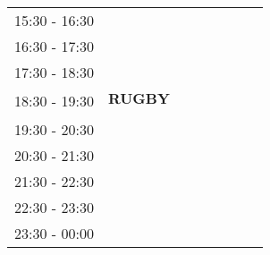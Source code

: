 \documentclass[10pt,spanish, landscape, twocolumn]{article}
\begin{document}
\begin{tabular}{|c|c|c|c|c|c|c|c|}
\multirow{2}{*}{15:30 - 16:30} & \textbf{} & \textbf{} & \textbf{} & \textbf{} & \textbf{} & \textbf{} & \textbf{} \\
& {\footnotesize } & {\footnotesize } & {\footnotesize } & {\footnotesize} & {\footnotesize} & {\footnotesize} & {\footnotesize} \\
\hline
\hline
\multirow{2}{*}{16:30 - 17:30} & \textbf{} & \textbf{} & \textbf{} & \textbf{} & \textbf{} & \textbf{} & \textbf{} \\
& {\footnotesize } & {\footnotesize } & {\footnotesize } & {\footnotesize} & {\footnotesize} & {\footnotesize} & {\footnotesize} \\
\hline
\multirow{2}{*}{17:30 - 18:30} & \textbf{} & \textbf{} & \textbf{} & \textbf{} & \textbf{} & \textbf{} & \textbf{} \\
& {\footnotesize } & {\footnotesize } & {\footnotesize } & {\footnotesize} & {\footnotesize} & {\footnotesize} & {\footnotesize} \\
\hline
\multirow{2}{*}{18:30 - 19:30} & \cellcolor{blue} \textbf{RUGBY} & \textbf{} & \textbf{} & \textbf{} & \textbf{} & \textbf{} & \textbf{} \\
& \cellcolor{blue} {\footnotesize } & {\footnotesize } & {\footnotesize } & {\footnotesize} & {\footnotesize} & {\footnotesize} & {\footnotesize} \\
\hline
\multirow{2}{*}{19:30 - 20:30}& \textbf{} & \textbf{} & \textbf{} & \textbf{} & \textbf{} & \textbf{} & \textbf{} \\
& {\footnotesize } & {\footnotesize } & {\footnotesize } & {\footnotesize} & {\footnotesize} & {\footnotesize} & {\footnotesize} \\
\hline
\multirow{2}{*}{20:30 - 21:30}& \textbf{} & \textbf{} & \textbf{} & \textbf{} & \textbf{} & \textbf{} & \textbf{} \\
& {\footnotesize } & {\footnotesize } & {\footnotesize } & {\footnotesize} & {\footnotesize} & {\footnotesize} & {\footnotesize} \\
\hline
\multirow{2}{*}{21:30 - 22:30}& \textbf{} & \textbf{} & \textbf{} & \textbf{} & \textbf{} & \textbf{} & \textbf{} \\
& {\footnotesize } & {\footnotesize } & {\footnotesize } & {\footnotesize} & {\footnotesize} & {\footnotesize} & {\footnotesize} \\
\hline
\multirow{2}{*}{22:30 - 23:30}& \textbf{} & \textbf{} & \textbf{} & \textbf{} & \textbf{} & \textbf{} & \textbf{} \\
& {\footnotesize } & {\footnotesize } & {\footnotesize } & {\footnotesize} & {\footnotesize} & {\footnotesize} & {\footnotesize} \\
\hline
\multirow{2}{*}{23:30 - 00:00}& \textbf{} & \textbf{} & \textbf{} & \textbf{} & \textbf{} & \textbf{} & \textbf{} \\
& {\footnotesize } & {\footnotesize } & {\footnotesize } & {\footnotesize} & {\footnotesize} & {\footnotesize} & {\footnotesize} \\
\hline
\end{tabular}
\\[4.90cm]
\end{document}
